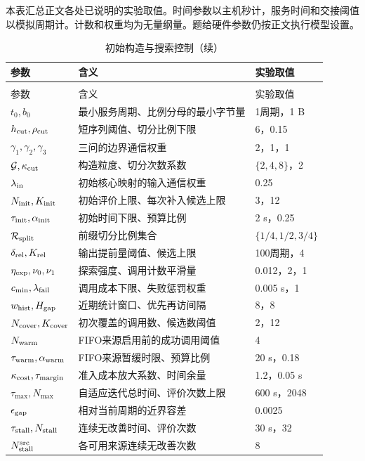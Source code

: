 \label{app:parameters}
本表汇总正文各处已说明的实验取值。时间参数以主机秒计，服务时间和交接阈值以模拟周期计。计数和权重均为无量纲量。题给硬件参数仍按正文执行模型设置。

\begingroup\small
\setlength{\tabcolsep}{4pt}
\setlength{\LTleft}{0pt}\setlength{\LTright}{0pt}
\begin{longtable}{@{}p{36mm}p{57mm}p{59mm}@{}}
\caption{初始构造与搜索控制}\label{tab:parameters_search}\\
\toprule
参数 & 含义 & 实验取值\\
\midrule
\endfirsthead
\caption[]{初始构造与搜索控制（续）}\\
\toprule
参数 & 含义 & 实验取值\\
\midrule
\endhead
\bottomrule
\endfoot
$t_0,b_0$ & 最小服务周期、比例分母的最小字节量 & 1周期，1 B\\
$h_{\rm cut},\rho_{\rm cut}$ & 短序列阈值、切分比例下限 & 6，0.15\\
$\gamma_1,\gamma_2,\gamma_3$ & 三问的边界通信权重 & 2，1，1\\
$\mathcal G,\kappa_{\rm cut}$ & 构造粒度、切分次数系数 & $\{2,4,8\}$，2\\
$\lambda_{\rm in}$ & 初始核心映射的输入通信权重 & 0.25\\
$N_{\rm init},K_{\rm init}$ & 初始评价上限、每次补入候选上限 & 3，12\\
$\tau_{\rm init},\alpha_{\rm init}$ & 初始时间下限、预算比例 & 2 s，0.25\\
$\mathcal R_{\rm split}$ & 前缀切分比例集合 & $\{1/4,1/2,3/4\}$\\
$\delta_{\rm rel},K_{\rm rel}$ & 输出提前量阈值、候选上限 & 100周期，4\\
$\eta_{\rm exp},\nu_0,\nu_1$ & 探索强度、调用计数平滑量 & 0.012，2，1\\
$c_{\min},\lambda_{\rm fail}$ & 调用成本下限、失败惩罚权重 & 0.005 s，1\\
$w_{\rm hist},H_{\rm gap}$ & 近期统计窗口、优先再访间隔 & 8，8\\
$N_{\rm cover},K_{\rm cover}$ & 初次覆盖的调用数、候选数阈值 & 2，12\\
$N_{\rm warm}$ & FIFO来源启用前的成功调用阈值 & 4\\
$\tau_{\rm warm},\alpha_{\rm warm}$ & FIFO来源暂缓时限、预算比例 & 20 s，0.18\\
$\kappa_{\rm cost},\tau_{\rm margin}$ & 准入成本放大系数、时间余量 & 1.2，0.05 s\\
$\tau_{\max},N_{\max}$ & 自适应迭代总时间、评价次数上限 & 600 s，2048\\
$\epsilon_{\rm gap}$ & 相对当前周期的近界容差 & 0.0025\\
$\tau_{\rm stall},N_{\rm stall}$ & 连续无改善时间、评价次数 & 30 s，32\\
$N_{\rm stall}^{\rm src}$ & 各可用来源连续无改善次数 & 8\\
\end{longtable}\endgroup

